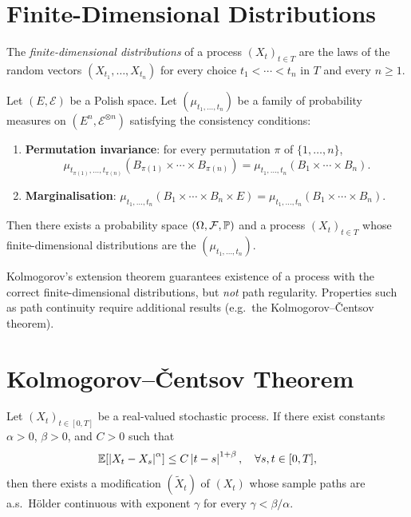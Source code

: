 \section{Finite-Dimensional Distributions}

\begin{definition}
The \emph{finite-dimensional distributions} of a process $(X_t)_{t \in T}$ are
the laws of the random vectors $(X_{t_1}, \ldots, X_{t_n})$ for every choice
$t_1 < \cdots < t_n$ in $T$ and every $n \geq 1$.
\end{definition}

\begin{theorem}
\label{thm:kolmogorov_extension}
Let $(E, \mathcal{E})$ be a Polish space. Let $(\mu_{t_1, \ldots, t_n})$ be a
family of probability measures on $(E^n, \mathcal{E}^{\otimes n})$ satisfying
the consistency conditions:
\begin{enumerate}
  \item \textbf{Permutation invariance}: for every permutation $\pi$ of
    $\{1, \ldots, n\}$,
    \[
      \mu_{t_{\pi(1)}, \ldots, t_{\pi(n)}}(B_{\pi(1)} \times \cdots \times B_{\pi(n)})
      = \mu_{t_1, \ldots, t_n}(B_1 \times \cdots \times B_n).
    \]
  \item \textbf{Marginalisation}:
    $\mu_{t_1, \ldots, t_n}(B_1 \times \cdots \times B_n \times E) = \mu_{t_1, \ldots, t_n}(B_1 \times \cdots \times B_n)$.
\end{enumerate}
Then there exists a probability space $(\Omega, \mathcal{F}, \mathbb{P})$ and a process
$(X_t)_{t \in T}$ whose finite-dimensional distributions are the
$(\mu_{t_1, \ldots, t_n})$.
\end{theorem}

\begin{warning}[title=\textbf{Limitations of Kolmogorov's Theorem}]
Kolmogorov's extension theorem guarantees existence of a process with the correct
finite-dimensional distributions, but \emph{not} path regularity. Properties
such as path continuity require additional results (e.g.\ the Kolmogorov--\v{C}entsov
theorem).
\end{warning}

\section{Kolmogorov--\v{C}entsov Theorem}

\begin{theorem}
\label{thm:kolmogorov_centsov}
Let $(X_t)_{t \in [0,T]}$ be a real-valued stochastic process. If there exist
constants $\alpha > 0$, $\beta > 0$, and $C > 0$ such that
\[
  \mathbb{E}[\left| X_t - X_s \right|^{\alpha}] \leq C \left| t - s \right|^{1 + \beta}, \quad
  \forall s, t \in [0, T],
\]
then there exists a modification $(\tilde{X}_t)$ of $(X_t)$ whose sample paths
are a.s.\ H\"older continuous with exponent $\gamma$ for every $\gamma < \beta/\alpha$.
\end{theorem}

